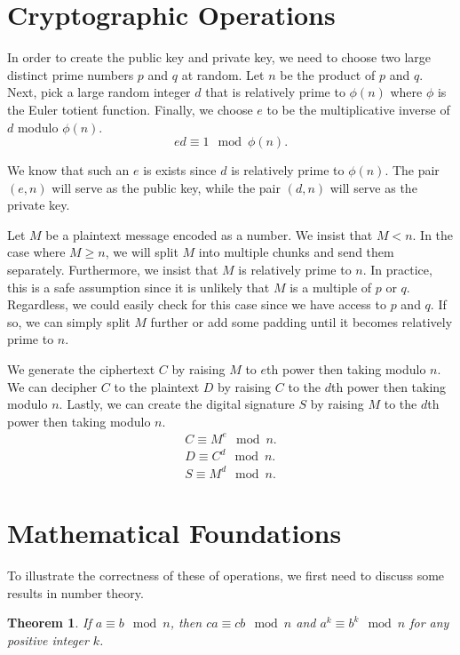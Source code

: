 \documentclass[10pt]{article}
\newtheorem{theorem}{Theorem}[section]
\begin{document}
\section{Cryptographic Operations}
In order to create the public key and private key, we need to choose two large distinct prime numbers $p$ and $q$ at random. Let $n$ be the product of $p$ and $q$. Next, pick a large random integer $d$ that is relatively prime to $\phi(n)$ where $\phi$ is the Euler totient function. Finally, we choose $e$ to be the multiplicative inverse of $d$ modulo $\phi(n)$.
\begin{equation*}
	e d \equiv 1 \mod \phi(n).
\end{equation*}

We know that such an $e$ is exists since $d$ is relatively prime to $\phi(n)$. The pair $(e, n)$ will serve as the public key, while the pair $(d, n)$ will serve as the private key.

Let $M$ be a plaintext message encoded as a number. We insist that $M < n$. In the case where $M \geq n$, we will split $M$ into multiple chunks and send them separately. Furthermore, we insist that $M$ is relatively prime to $n$. In practice, this is a safe assumption since it is unlikely that $M$ is a multiple of $p$ or $q$. Regardless, we could easily check for this case since we have access to $p$ and $q$. If so, we can simply split $M$ further or add some padding until it becomes relatively prime to $n$.

We generate the ciphertext $C$ by raising $M$ to $e$th power then taking modulo $n$. We can decipher $C$ to the plaintext $D$ by raising $C$ to the $d$th power then taking modulo $n$. Lastly, we can create the digital signature $S$ by raising $M$ to the $d$th power then taking modulo $n$.
\begin{align*}
    C \equiv M^e \mod n.
 \\ D \equiv C^d \mod n.
 \\ S \equiv M^d \mod n.
\end{align*}


\section{Mathematical Foundations}
To illustrate the correctness of these of operations, we first need to discuss some results in number theory.

\begin{theorem}
\label{cong_thms}
    If $a \equiv b \mod n$, then $c a \equiv c b \mod n$ and $a^k \equiv b^k \mod n$ for any positive integer $k$.
\end{theorem}
\end{document}
